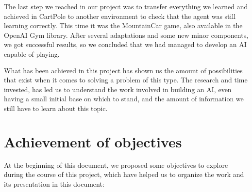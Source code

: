 The last step we reached in our project was to transfer everything we learned and achieved in CartPole to another environment to check that the agent was still learning correctly. This time it was the MountainCar game, also available in the OpenAI Gym library. After several adaptations and some new minor components, we got successful results, so we concluded that we had managed to develop an AI capable of playing.

What has been achieved in this project has shown us the amount of possibilities that exist when it comes to solving a problem of this type. The research and time invested, has led us to understand the work involved in building an AI, even having a small initial base on which to stand, and the amount of information we still have to learn about this topic.

\section{Achievement of objectives}

At the beginning of this document, we proposed some objectives to explore during the course of this project, which have helped us to organize the work and its presentation in this document:


